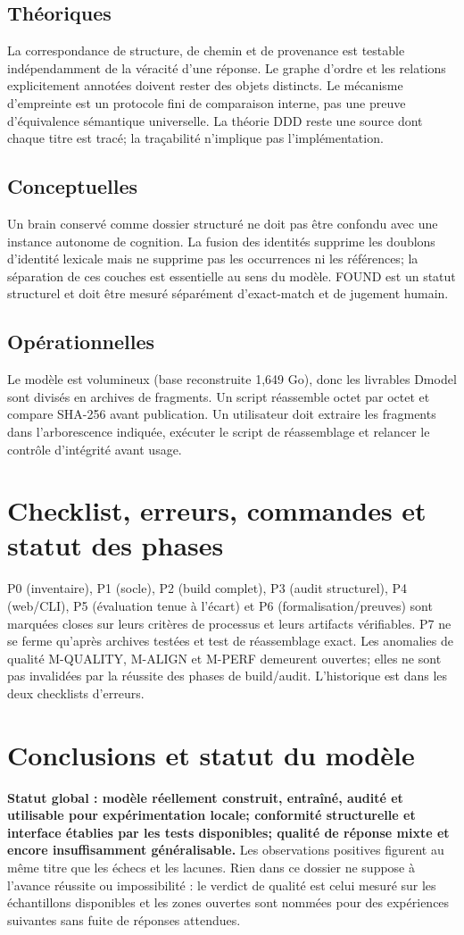 \documentclass[11pt,a4paper,openany]{book}
\begin{document}
\section{Théoriques}
La correspondance de structure, de chemin et de provenance est testable indépendamment de la véracité d'une réponse. Le graphe d'ordre et les relations explicitement annotées doivent rester des objets distincts. Le mécanisme d'empreinte est un protocole fini de comparaison interne, pas une preuve d'équivalence sémantique universelle. La théorie DDD reste une source dont chaque titre est tracé; la traçabilité n'implique pas l'implémentation.
\section{Conceptuelles}
Un brain conservé comme dossier structuré ne doit pas être confondu avec une instance autonome de cognition. La fusion des identités supprime les doublons d'identité lexicale mais ne supprime pas les occurrences ni les références; la séparation de ces couches est essentielle au sens du modèle. FOUND est un statut structurel et doit être mesuré séparément d'exact-match et de jugement humain.
\section{Opérationnelles}
Le modèle est volumineux (base reconstruite 1,649 Go), donc les livrables Dmodel sont divisés en archives de fragments. Un script réassemble octet par octet et compare SHA-256 avant publication. Un utilisateur doit extraire les fragments dans l'arborescence indiquée, exécuter le script de réassemblage et relancer le contrôle d'intégrité avant usage.

\chapter{Checklist, erreurs, commandes et statut des phases}
P0 (inventaire), P1 (socle), P2 (build complet), P3 (audit structurel), P4 (web/CLI), P5 (évaluation tenue à l'écart) et P6 (formalisation/preuves) sont marquées closes sur leurs critères de processus et leurs artifacts vérifiables. P7 ne se ferme qu'après archives testées et test de réassemblage exact. Les anomalies de qualité M-QUALITY, M-ALIGN et M-PERF demeurent ouvertes; elles ne sont pas invalidées par la réussite des phases de build/audit. L'historique est dans les deux checklists d'erreurs.

\chapter{Conclusions et statut du modèle}
\textbf{Statut global : modèle réellement construit, entraîné, audité et utilisable pour expérimentation locale; conformité structurelle et interface établies par les tests disponibles; qualité de réponse mixte et encore insuffisamment généralisable.} Les observations positives figurent au même titre que les échecs et les lacunes. Rien dans ce dossier ne suppose à l'avance réussite ou impossibilité : le verdict de qualité est celui mesuré sur les échantillons disponibles et les zones ouvertes sont nommées pour des expériences suivantes sans fuite de réponses attendues.
\end{document}
